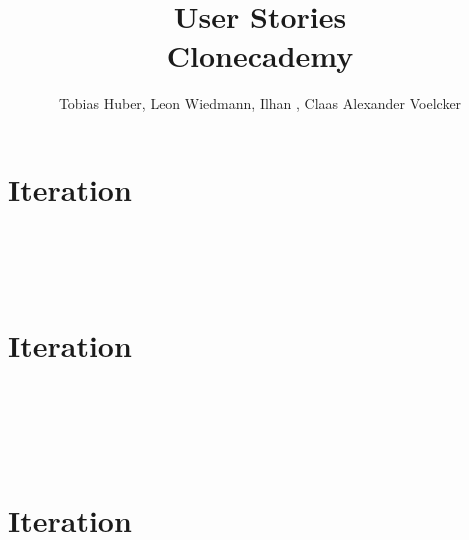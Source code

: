 \documentclass
[english,accentcolor=tud1c]
{tudreport}
\title{User Stories\\Clonecademy}
\author{Tobias Huber, Leon Wiedmann, Ilhan , Claas Alexander Voelcker}
\begin{document}

	\maketitle
	\tableofcontents

	\chapter{Iteration}

	 \\
	 \\
	 \\

	\chapter{Iteration}
	
	 \\
	 \\
	 \\
	 \\
	
	
	\chapter{Iteration}
	
\end{document}
